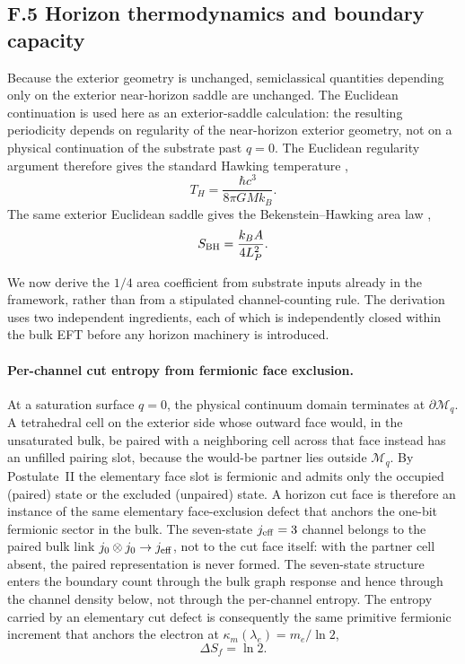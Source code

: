 \documentclass[11pt]{article}
\begin{document}
\subsection*{F.5 Horizon thermodynamics and boundary capacity}

Because the exterior geometry is unchanged, semiclassical quantities depending only on the exterior near-horizon saddle are unchanged. The Euclidean continuation is used here as an exterior-saddle calculation: the resulting periodicity depends on regularity of the near-horizon exterior geometry, not on a physical continuation of the substrate past $q=0$. The Euclidean regularity argument therefore gives the standard Hawking temperature \citep{Hawking1975,GibbonsHawking1977},
\[
T_H=\frac{\hbar c^3}{8\pi GM k_B}.
\]
The same exterior Euclidean saddle gives the Bekenstein--Hawking area law \citep{Bekenstein1973,Hawking1975},
\[
S_{\rm BH}=\frac{k_BA}{4L_P^2}.
\]

We now derive the $1/4$ area coefficient from substrate inputs already in the framework, rather than from a stipulated channel-counting rule. The derivation uses two independent ingredients, each of which is independently closed within the bulk EFT before any horizon machinery is introduced.

\paragraph{Per-channel cut entropy from fermionic face exclusion.}
At a saturation surface $q=0$, the physical continuum domain terminates at $\partial\mathcal{M}_q$. A tetrahedral cell on the exterior side whose outward face would, in the unsaturated bulk, be paired with a neighboring cell across that face instead has an unfilled pairing slot, because the would-be partner lies outside $\mathcal{M}_q$. By Postulate~II the elementary face slot is fermionic and admits only the occupied (paired) state or the excluded (unpaired) state. A horizon cut face is therefore an instance of the same elementary face-exclusion defect that anchors the one-bit fermionic sector in the bulk. The seven-state $j_{\rm eff}=3$ channel belongs to the paired bulk link $j_0\otimes j_0\to j_{\rm eff}$, not to the cut face itself: with the partner cell absent, the paired representation is never formed. The seven-state structure enters the boundary count through the bulk graph response and hence through the channel density below, not through the per-channel entropy. The entropy carried by an elementary cut defect is consequently the same primitive fermionic increment that anchors the electron at $\kappa_m(\lambda_e)=m_e/\ln 2$,
\[
\Delta S_f=\ln 2.
\]
\end{document}

